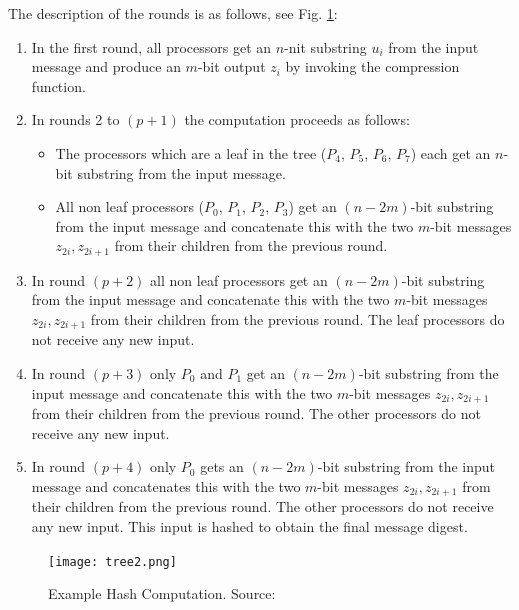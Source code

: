 \documentclass[letterpaper]{article}
\begin{document}
The description of the rounds is as follows, see Fig. \ref{fig:tree2}:
\begin{enumerate}
\item In the first round, all processors get an $n$-nit substring $u_i$ from the input message and produce an $m$-bit output $z_i$ by invoking the compression function.
\item In rounds 2 to $(p+1)$ the computation proceeds as follows:
\begin{itemize}
\item The processors which are a leaf in the tree ($P_4$, $P_5$, $P_6$, $P_7$) each get an $n$-bit substring from the input message.
\item All non leaf processors ($P_0$, $P_1$, $P_2$, $P_3$) get an $(n-2m)$-bit substring from the input message and concatenate this with the two $m$-bit messages $z_{2i}, z_{2i+1}$ from their children from the previous round.
\end{itemize}

\item  In round $(p+2)$ all non leaf processors get an  $(n-2m)$-bit substring from the input message and concatenate this with the two $m$-bit messages $z_{2i}, z_{2i+1}$ from their children from the previous round. The leaf processors do not receive any new input.

\item In round $(p+3)$ only $P_0$ and $P_1$ get an  $(n-2m)$-bit substring from the input message and concatenate this with the two $m$-bit messages $z_{2i}, z_{2i+1}$ from their children from the previous round. The other processors do not receive any new input.

\item In round $(p+4)$ only $P_0$ gets an  $(n-2m)$-bit substring from the input message and concatenates this with the two $m$-bit messages $z_{2i}, z_{2i+1}$ from their children from the previous round. The other processors do not receive any new input. This input is hashed to obtain the final message digest.
\end{enumerate}



\begin{figure}[h!]
\begin{center}

 \texttt{[image: tree2.png]}
 \end{center}


  \caption{Example Hash Computation. Source: \cite{parsha256}}
  \label{fig:tree2}
\end{figure} 
\end{document}
